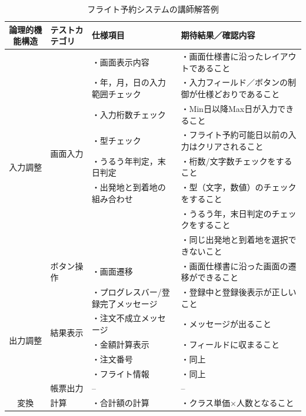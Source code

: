 \begin{table}[htbp]
\footnotesize
  \centering
  \caption{フライト予約システムの講師解答例}
    \begin{tabular}{|c|l|p{10.5em}|p{13em}|}
    \hline
    \multicolumn{1}{|p{7em}|}{論理的機能構造} & \multicolumn{1}{p{7em}|}{テストカテゴリ} & 仕様項目  & 期待結果／確認内容 \bigstrut\\
    \hline
    \hline
    \multicolumn{1}{|c|}{\multirow{9}[4]{*}{入力調整}} & \multicolumn{1}{l|}{\multirow{8}[2]{*}{画面入力}} & ・画面表示内容 & ・画面仕様書に沿ったレイアウトであること \bigstrut[t]\\
          &       & ・年，月，日の入力範囲チェック & ・入力フィールド／ボタンの制御が仕様どおりであること \\
          &       & ・入力桁数チェック & ・Min日以降Max日が入力できること\\
          &       & ・型チェック & ・フライト予約可能日以前の入力はクリアされること\\
          &       & ・うるう年判定，末日判定 & ・桁数/文字数チェックをすること\\
          &       & ・出発地と到着地の組み合わせ & ・型（文字，数値）のチェックをすること\\
          &       & \multicolumn{1}{r|}{} & ・うるう年，末日判定のチェックをすること \\
          &       & \multicolumn{1}{r|}{} & ・同じ出発地と到着地を選択できないこと \bigstrut[b]\\
\cline{2-4}          & \multicolumn{1}{p{7.75em}|}{ボタン操作} & ・画面遷移 & ・画面仕様書に沿った画面の遷移ができること \bigstrut\\
    \hline
    \multicolumn{1}{|c|}{\multirow{6}[4]{*}{出力調整}} & \multicolumn{1}{l|}{\multirow{5}[2]{*}{結果表示}} & ・プログレスバー/登録完了メッセージ & ・登録中と登録後表示が正しいこと \bigstrut[t]\\
          &       & ・注文不成立メッセージ & ・メッセージが出ること \\
          &       & ・金額計算表示 & ・フィールドに収まること \\
          &       & ・注文番号 & ・同上 \\
          &       & ・フライト情報 & ・同上\bigstrut[b]\\
\cline{2-4}          & \multicolumn{1}{p{7.75em}|}{帳票出力} & --    & -- \bigstrut\\
    \hline
    \multicolumn{1}{|c|}{\multirow{3}[2]{*}{変換}} & \multicolumn{1}{l|}{\multirow{4}[2]{*}{計算}} & ・合計額の計算 & ・クラス単価×人数となること \bigstrut[t]\\

\end{tabular}
\end{table}
